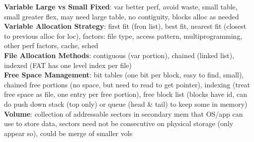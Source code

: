 \documentclass[a4paper]{article}
\begin{document}
\begin{multicols}{2}
        \textbf{Variable Large vs Small Fixed}: var better perf, avoid waste, small table, small greater flex, may need large table, no contiguity, blocks alloc as needed\\
        \textbf{Variable Allocation Strategy}: first fit (fron list), best fit, nearest fit (closest to previous alloc for loc), factors: file type, access pattern, multiprogramming, other perf factors, cache, sched\\
        \textbf{File Allocation Methods}: contiguous (var portion), chained (linked list), indexed (FAT has one level index per file)\\
        \textbf{Free Space Management}: bit tables (one bit per block, easy to find, small), chained free portions (no space, but need to read to get pointer), indexing (treat free space as file, one entry per free portion), free block list (blocks have id, can do push down stack (top only) or queue (head \& tail) to keep some in memory)
        \textbf{Volume}: collection of addressable sectors in secondary mem that OS/app can use to store data, sectors need not be consecutive on physical storage (only appear so), could be merge of smaller vols\\
    \end{multicols}
    
\end{document}
